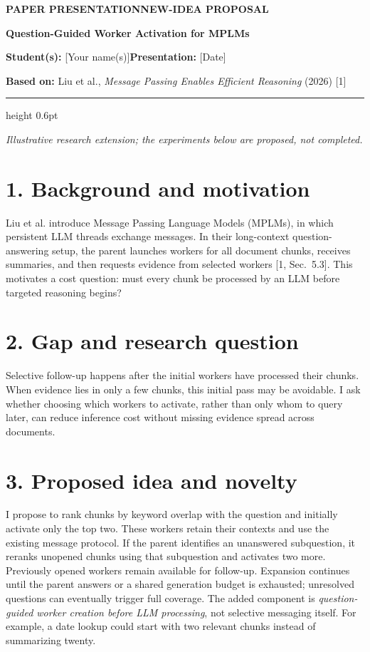 \documentclass[11pt,letterpaper]{article}
\newcommand{\proposalheader}[4]{%
  {\small\sffamily\bfseries\color{ProposalBlue}
   PAPER PRESENTATION\enspace\textbullet\enspace NEW-IDEA PROPOSAL}\par
  \vspace{3pt}
  {\fontsize{16}{18}\selectfont\bfseries #1\par}
  \vspace{4pt}
  \textbf{Student(s):} #2\hfill\textbf{Presentation:} #3\par
  \textbf{Based on:} #4\par
  \vspace{3pt}
  {\color{ProposalBlue}\hrule height 0.6pt}
  \vspace{4pt}
}
\newcommand{\guide}[1]{{\color{SecondaryText}#1}}
\begin{document}
\proposalheader{Question-Guided Worker Activation for MPLMs}
  {[Your name(s)]}{[Date]}
  {Liu et al., \textit{Message Passing Enables Efficient Reasoning} (2026) [1]}

\guide{\textit{Illustrative research extension; the experiments below are proposed, not completed.}}

\section*{1. Background and motivation}
Liu et al. introduce Message Passing Language Models (MPLMs), in which persistent
LLM threads exchange messages. In their long-context question-answering setup,
the parent launches workers for all document chunks, receives summaries, and then
requests evidence from selected workers [1, Sec.~5.3]. This motivates a cost question:
must every chunk be processed by an LLM before targeted reasoning begins?

\section*{2. Gap and research question}
Selective follow-up happens after the initial workers have processed their chunks.
When evidence lies in only a few chunks, this initial pass may be avoidable. I ask
whether choosing which workers to activate, rather than only whom to query later,
can reduce inference cost without missing evidence spread across documents.

\section*{3. Proposed idea and novelty}
I propose to rank chunks by keyword overlap with the question and initially activate
only the top two. These workers retain their contexts and use the existing message
protocol. If the parent identifies an unanswered subquestion, it reranks unopened
chunks using that subquestion and activates two more. Previously opened workers
remain available for follow-up. Expansion continues until the parent answers or a
shared generation budget is exhausted; unresolved questions can eventually trigger
full coverage. The added component is \emph{question-guided worker creation before LLM
processing}, not selective messaging itself. For example, a date lookup could start
with two relevant chunks instead of summarizing twenty.
\end{document}
